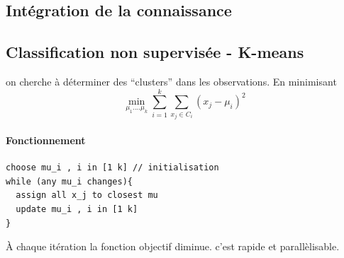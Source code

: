 \documentclass[main.tex]{subfiles}
\begin{document}
\subsection{Intégration de la connaissance}
\subsection{Classification non supervisée - K-means}

on cherche à déterminer des ``clusters''  dans les observations. En minimisant
\[
 \min_{\mu_1....\mu_k} \sum_{i=1}^{k}\sum_{x_j\in C_i}^{} (x_j-\mu_i)^2
\]

\paragraph{Fonctionnement}
\begin{verbatim}
choose mu_i , i in [1 k] // initialisation
while (any mu_i changes){
  assign all x_j to closest mu
  update mu_i , i in [1 k]
}
\end{verbatim}
À chaque itération la fonction objectif diminue. c'est rapide et parallèlisable.
\end{document}
